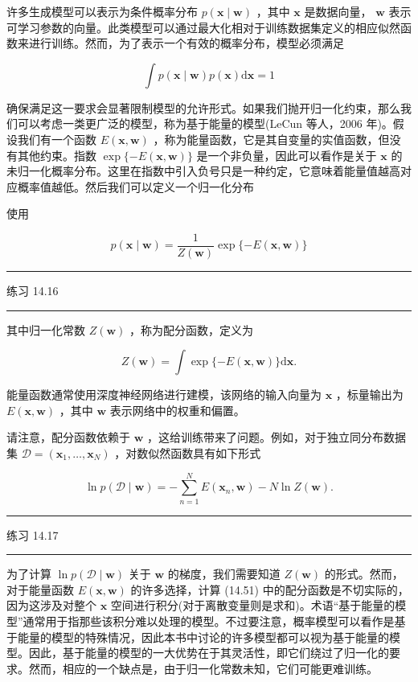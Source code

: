 \documentclass[10pt]{article}
\newcommand{\HRule}{\begin{center}\rule{0.9\linewidth}{0.2mm}\end{center}}
\begin{document}
许多生成模型可以表示为条件概率分布 \(p\left( {\mathbf{x} \mid  \mathbf{w}}\right)\) ，其中 \(\mathbf{x}\) 是数据向量， \(\mathbf{w}\) 表示可学习参数的向量。此类模型可以通过最大化相对于训练数据集定义的相应似然函数来进行训练。然而，为了表示一个有效的概率分布，模型必须满足

\[
\int p\left( {\mathbf{x} \mid  \mathbf{w}}\right) p\left( \mathbf{x}\right) \mathrm{d}\mathbf{x} = 1 \tag{14.49}
\]

确保满足这一要求会显著限制模型的允许形式。如果我们抛开归一化约束，那么我们可以考虑一类更广泛的模型，称为基于能量的模型(LeCun 等人，2006 年)。假设我们有一个函数 \(E\left( {\mathbf{x},\mathbf{w}}\right)\) ，称为能量函数，它是其自变量的实值函数，但没有其他约束。指数 \(\exp \{  - E\left( {\mathbf{x},\mathbf{w}}\right) \}\) 是一个非负量，因此可以看作是关于 \(\mathbf{x}\) 的未归一化概率分布。这里在指数中引入负号只是一种约定，它意味着能量值越高对应概率值越低。然后我们可以定义一个归一化分布

使用

\[
p\left( {\mathbf{x} \mid  \mathbf{w}}\right)  = \frac{1}{Z\left( \mathbf{w}\right) }\exp \{  - E\left( {\mathbf{x},\mathbf{w}}\right) \}  \tag{14.50}
\]

\HRule

练习 14.16

\HRule

其中归一化常数 \(Z\left( \mathbf{w}\right)\) ，称为配分函数，定义为

\[
Z\left( \mathbf{w}\right)  = \int \exp \{  - E\left( {\mathbf{x},\mathbf{w}}\right) \} \mathrm{d}\mathbf{x}. \tag{14.51}
\]

能量函数通常使用深度神经网络进行建模，该网络的输入向量为 \(\mathbf{x}\) ，标量输出为 \(E\left( {\mathbf{x},\mathbf{w}}\right)\) ，其中 \(\mathbf{w}\) 表示网络中的权重和偏置。

请注意，配分函数依赖于 \(\mathbf{w}\) ，这给训练带来了问题。例如，对于独立同分布数据集 \(\mathcal{D} = \left( {{\mathbf{x}}_{1},\ldots ,{\mathbf{x}}_{N}}\right)\) ，对数似然函数具有如下形式

\[
\ln p\left( {\mathcal{D} \mid  \mathbf{w}}\right)  =  - \mathop{\sum }\limits_{{n = 1}}^{N}E\left( {{\mathbf{x}}_{n},\mathbf{w}}\right)  - N\ln Z\left( \mathbf{w}\right) . \tag{14.52}
\]

\HRule

练习 14.17

\HRule

为了计算 \(\ln p\left( {\mathcal{D} \mid  \mathbf{w}}\right)\) 关于 \(\mathbf{w}\) 的梯度，我们需要知道 \(Z\left( \mathbf{w}\right)\) 的形式。然而，对于能量函数 \(E\left( {\mathbf{x},\mathbf{w}}\right)\) 的许多选择，计算 (14.51) 中的配分函数是不切实际的，因为这涉及对整个 \(\mathbf{x}\) 空间进行积分(对于离散变量则是求和)。术语“基于能量的模型”通常用于指那些该积分难以处理的模型。不过要注意，概率模型可以看作是基于能量的模型的特殊情况，因此本书中讨论的许多模型都可以视为基于能量的模型。因此，基于能量的模型的一大优势在于其灵活性，即它们绕过了归一化的要求。然而，相应的一个缺点是，由于归一化常数未知，它们可能更难训练。
\end{document}
